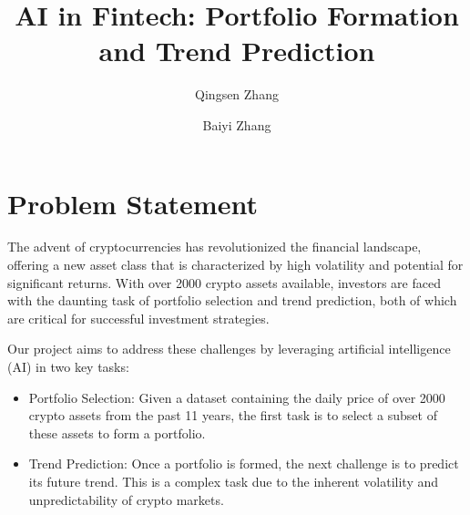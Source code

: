 \documentclass[journal, onecolumn]{IEEEtran}
\begin{document}
\title{{\Large \textbf{AI in Fintech: Portfolio Formation and Trend Prediction}}}

\author[1]{Qingsen Zhang}
\author[1]{Baiyi Zhang}


\maketitle



\section{Problem Statement}
The advent of cryptocurrencies has revolutionized the financial landscape, offering a new asset class that is characterized by high volatility and potential for significant returns. With over 2000 crypto assets available, investors are faced with the daunting task of portfolio selection and trend prediction, both of which are critical for successful investment strategies.

Our project aims to address these challenges by leveraging artificial intelligence (AI) in two key tasks:
\begin{itemize}
  \item Portfolio Selection: Given a dataset containing the daily price of over 2000 crypto assets from the past 11 years, the first task is to select a subset of these assets to form a portfolio. 
  \item Trend Prediction: Once a portfolio is formed, the next challenge is to predict its future trend. This is a complex task due to the inherent volatility and unpredictability of crypto markets.
\end{itemize}
\end{document}

